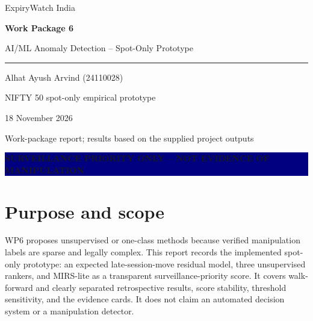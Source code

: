 \documentclass[11pt,a4paper]{article}
\newcommand{\banner}{\begin{center}\colorbox{navy}{\parbox{0.94\linewidth}{\centering\color{white}\textbf{SURVEILLANCE PRIORITY ONLY -- NOT EVIDENCE OF MANIPULATION}}}\end{center}}
\begin{document}
\begin{titlepage}\centering\vspace*{22mm}
{\Large ExpiryWatch India\par}\vspace{18mm}
{\color{navy}\Huge\bfseries Work Package 6\par}\vspace{8mm}
{\Large AI/ML Anomaly Detection -- Spot-Only Prototype\par}\vspace{18mm}
\rule{0.72\linewidth}{0.7pt}\par\vspace{12mm}
{\large Alhat Ayush Arvind (24110028)\par}\vspace{4mm}
{\large NIFTY 50 spot-only empirical prototype\par}\vfill
{\large 18 November 2026\par}\vspace{5mm}
{\small Work-package report; results based on the supplied project outputs}\par
\end{titlepage}
\banner
\begin{abstract}
This report documents a walk-forward residual model, Isolation Forest, Local Outlier Factor, One-Class SVM, and a transparent MIRS-lite score for ranking NIFTY expiry events for review. The unsupervised models show weak agreement; consensus at the 90th percentile exceeds a permutation independence baseline, but its enrichment partly reuses the same behaviour features. The ML incremental-value gate is not passed, the news discount is unvalidated, and tier membership is sensitive to its threshold. The system is a screening prototype, not evidence of manipulation.
\end{abstract}
\tableofcontents\clearpage
\section{Purpose and scope}
WP6 proposes unsupervised or one-class methods because verified manipulation labels are sparse and legally complex. This report records the implemented spot-only prototype: an expected late-session-move residual model, three unsupervised rankers, and MIRS-lite as a transparent surveillance-priority score. It covers walk-forward and clearly separated retrospective results, score stability, threshold sensitivity, and the evidence cards. It does not claim an automated decision system or a manipulation detector.
\end{document}
